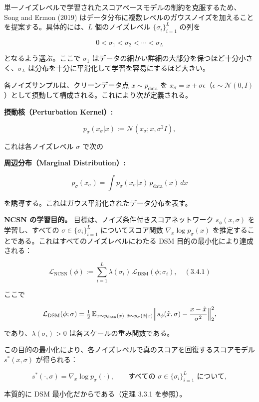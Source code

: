 単一ノイズレベルで学習されたスコアベースモデルの制約を克服するため、Song and Ermon (2019) はデータ分布に複数レベルのガウスノイズを加えることを提案する。具体的には、$L$ 個のノイズレベル $\{\sigma_i\}_{i=1}^L$ の列を

\[
0 < \sigma_1 < \sigma_2 < \cdots < \sigma_L
\]


となるよう選ぶ。ここで $\sigma_1$ はデータの細かい詳細の大部分を保つほど十分小さく、$\sigma_L$ は分布を十分に平滑化して学習を容易にするほど大きい。

各ノイズサンプルは、クリーンデータ点 $x\sim p_{\mathrm{data}}$ を $x_\sigma=x+\sigma\epsilon$（$\epsilon\sim\mathcal{N}(0,I)$）として摂動して構成される。これにより次が定義される。

\textbf{摂動核（Perturbation Kernel）:}

\[
p_\sigma(x_\sigma|x):=\mathcal{N}(x_\sigma;x,\sigma^2 I),
\]


これは各ノイズレベル $\sigma$ で次の

\textbf{周辺分布（Marginal Distribution）:}

\[
p_\sigma(x_\sigma)=\int p_\sigma(x_\sigma|x)\,p_{\mathrm{data}}(x)\,dx
\]


を誘導する。これはガウス平滑化されたデータ分布を表す。

\textbf{NCSN の学習目的。} 目標は、ノイズ条件付きスコアネットワーク $s_\phi(x,\sigma)$ を学習し、すべての $\sigma\in\{\sigma_i\}_{i=1}^L$ についてスコア関数 $\nabla_x\log p_\sigma(x)$ を推定することである。これはすべてのノイズレベルにわたる DSM 目的の最小化により達成される：

\[
\mathcal{L}_{\mathrm{NCSN}}(\phi)
:= \sum_{i=1}^L \lambda(\sigma_i)\,\mathcal{L}_{\mathrm{DSM}}(\phi;\sigma_i),\quad (3.4.1)
\]


ここで

\[
\mathcal{L}_{\mathrm{DSM}}(\phi;\sigma)
= \tfrac{1}{2}\,\mathbb{E}_{x\sim p_{\mathrm{data}}(x),\,\tilde{x}\sim p_\sigma(\tilde{x}|x)}
\Bigl\|s_\phi(\tilde{x},\sigma)-\frac{x-\tilde{x}}{\sigma^2}\Bigr\|_2^2,
\]


であり、$\lambda(\sigma_i)>0$ は各スケールの重み関数である。

この目的の最小化により、各ノイズレベルで真のスコアを回復するスコアモデル $s^*(x,\sigma)$ が得られる：

\[
s^*(\cdot,\sigma)=\nabla_x\log p_\sigma(\cdot),
\qquad\text{すべての }\sigma\in\{\sigma_i\}_{i=1}^L\text{ について},
\]


本質的に DSM 最小化だからである（定理 3.3.1 を参照）。

